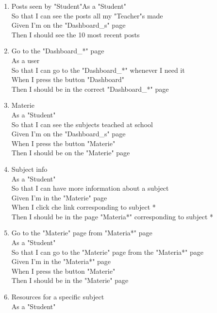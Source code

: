 \documentclass[Lau, binding=0.6cm]{sapthesis}
\begin{document}
\begin{enumerate}
	\item Posts seen by "Student"As a "Student"\\
			So that I can see the posts all my "Teacher"s made\\
			Given I’m on the "Dashboard\_s" page\\
			Then I should see the 10 most recent posts\\
	\item Go to the "Dashboard\_*" page\\
			As a user\\
			So that I can go to the "Dashboard\_*" whenever I need it\\
			When I press the button "Dashboard"\\
			Then I should be in the correct "Dashboard\_*" page\\
	\item Materie\\
			As a "Student"\\
			So that I can see the subjects teached at school\\
			Given I’m on the "Dashboard\_s" page\\
			When I press the button "Materie"\\
			Then I should be on the "Materie" page\\
	\item Subject info\\
			As a "Student"\\
			So that I can have more information about a subject\\
			Given I’m in the "Materie" page\\
			When I click che link corresponding to subject *\\
			Then I should be in the page "Materia*" corresponding to subject *\\
	\item Go to the "Materie" page from "Materia*" page\\
			As a "Student"\\
			So that I can go to the "Materie" page from the "Materia*" page\\
			Given I’m in the "Materia*" page\\
			When I press the button "Materie"\\
			Then I should be in the "Materie" page\\
	\item Resources for a specific subject\\
			As a "Student"\\

\end{enumerate}
\end{document}
